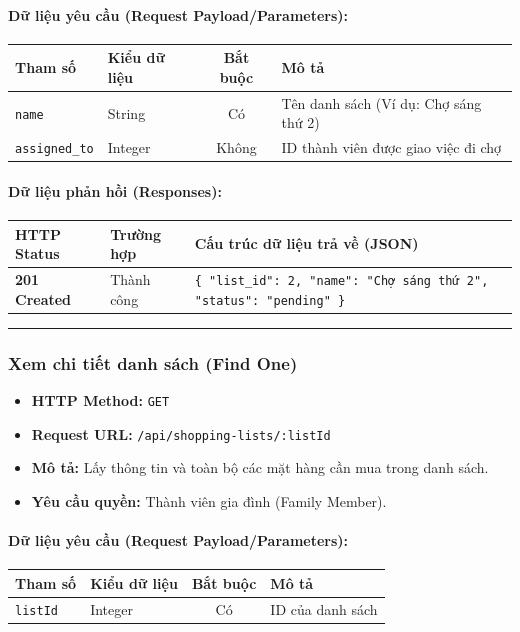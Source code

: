 \documentclass[12pt,a4paper]{article}
\begin{document}
\paragraph{Dữ liệu yêu cầu (Request Payload/Parameters):}
\begin{longtable}{|p{2.8cm}|p{2.2cm}|c|p{7.0cm}|}
\hline
\textbf{Tham số} & \textbf{Kiểu dữ liệu} & \textbf{Bắt buộc} & \textbf{Mô tả} \\ \hline
\endhead
\texttt{name} & String & Có & Tên danh sách (Ví dụ: Chợ sáng thứ 2) \\ \hline
\texttt{assigned\_to} & Integer & Không & ID thành viên được giao việc đi chợ \\ \hline
\end{longtable}

\paragraph{Dữ liệu phản hồi (Responses):}
\begin{longtable}{|p{2.8cm}|p{3.2cm}|p{8.0cm}|}
\hline
\textbf{HTTP Status} & \textbf{Trường hợp} & \textbf{Cấu trúc dữ liệu trả về (JSON)} \\ \hline
\endhead
\textbf{201 Created} & Thành công & \texttt{\{ "list\_id": 2, "name": "Chợ sáng thứ 2", "status": "pending" \}} \\ \hline
\end{longtable}

\vskip 0.4cm
\noindent\rule{\textwidth}{0.3pt}
\vskip 0.4cm

\subsubsection{Xem chi tiết danh sách (Find One)}
\begin{itemize}[leftmargin=*]
    \item \textbf{HTTP Method:} \texttt{GET}
    \item \textbf{Request URL:} \texttt{/api/shopping-lists/:listId}
    \item \textbf{Mô tả:} Lấy thông tin và toàn bộ các mặt hàng cần mua trong danh sách.
    \item \textbf{Yêu cầu quyền:} Thành viên gia đình (Family Member).
\end{itemize}

\paragraph{Dữ liệu yêu cầu (Request Payload/Parameters):}
\begin{longtable}{|p{2.8cm}|p{2.2cm}|c|p{7.0cm}|}
\hline
\textbf{Tham số} & \textbf{Kiểu dữ liệu} & \textbf{Bắt buộc} & \textbf{Mô tả} \\ \hline
\endhead
\texttt{listId} & Integer & Có & ID của danh sách \\ \hline
\end{longtable}
\end{document}

